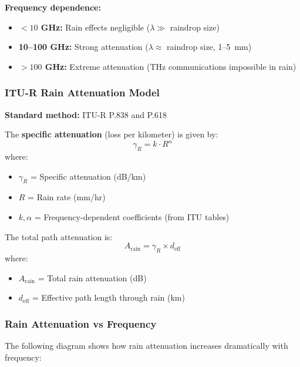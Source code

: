 \textbf{Frequency dependence:}
\begin{itemize}
\item \textbf{$< 10$ GHz:} Rain effects negligible ($\lambda \gg$ raindrop size)
\item \textbf{10--100 GHz:} Strong attenuation ($\lambda \approx$ raindrop size, 1--5~mm)
\item \textbf{$> 100$ GHz:} Extreme attenuation (THz communications impossible in rain)
\end{itemize}

\subsubsection{ITU-R Rain Attenuation Model}

\textbf{Standard method:} ITU-R P.838 and P.618

The \textbf{specific attenuation} (loss per kilometer) is given by:
\begin{equation}
\gamma_R = k \cdot R^\alpha
\end{equation}
where:
\begin{itemize}
\item $\gamma_R$ = Specific attenuation (dB/km)
\item $R$ = Rain rate (mm/hr)
\item $k, \alpha$ = Frequency-dependent coefficients (from ITU tables)
\end{itemize}

The total path attenuation is:
\begin{equation}
A_{\text{rain}} = \gamma_R \times d_{\text{eff}}
\end{equation}
where:
\begin{itemize}
\item $A_{\text{rain}}$ = Total rain attenuation (dB)
\item $d_{\text{eff}}$ = Effective path length through rain (km)
\end{itemize}

\subsubsection{Rain Attenuation vs Frequency}

The following diagram shows how rain attenuation increases dramatically with frequency:

